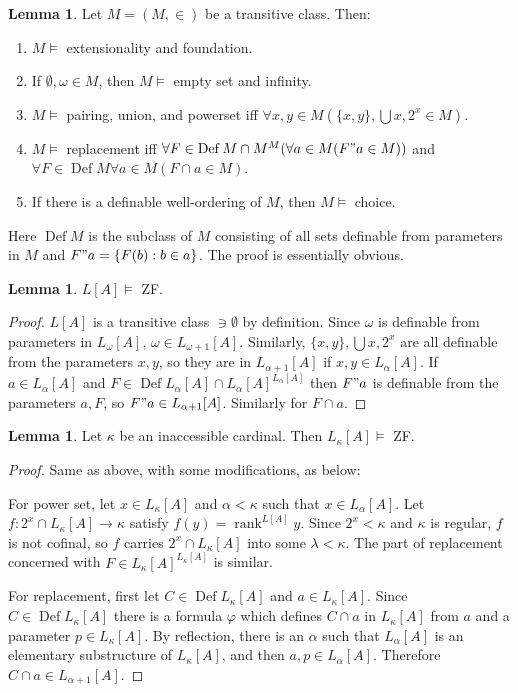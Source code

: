 \documentclass[12pt]{report}
\newcommand{\rank}{\operatorname{rank}}
\DeclareMathOperator{\Def}{Def}
\theoremstyle{definition}
\newtheorem{lemma}[theorem]{Lemma}
\begin{document}
\begin{lemma}
Let $M = (M, \in)$ be a transitive class. Then:
\begin{enumerate}
\item $M \models $ extensionality and foundation.
\item If $\emptyset, \omega \in M$, then $M \models $ empty set and infinity.
\item $M \models $ pairing, union, and powerset iff $\forall x, y \in M(\{x, y\}, \bigcup x, 2^x \in M)$.
\item $M \models $ replacement iff $\forall F \in \Def M \cap M^M(\forall a \in M(F"a \in M))$ and $\forall F \in \Def M \forall a \in M(F \cap a \in M)$.
\item If there is a definable well-ordering of $M$, then $M \models $ choice.
\end{enumerate}
\end{lemma}
Here $\Def M$ is the subclass of $M$ consisting of all sets definable from parameters in $M$ and $F"a = \{F(b): b \in a\}$. The proof is essentially obvious.

\begin{lemma}
$L[A] \models $ ZF.
\end{lemma}
\begin{proof}
$L[A]$ is a transitive class $\ni \emptyset$ by definition. Since $\omega$ is definable from parameters in $L_\omega[A]$, $\omega \in L_{\omega + 1}[A]$.
Similarly, $\{x, y\},\bigcup x, 2^x$ are all definable from the parameters $x,y$, so they are in $L_{\alpha + 1}[A]$ if $x, y\in L_\alpha[A]$.
If $a \in L_\alpha[A]$ and $F \in \Def L_\alpha[A] \cap L_{\alpha}[A]^{L_\alpha[A]}$ then $F"a$ is definable from the parameters $a,F$, so $F"a \in L_{\alpha + 1}[A]$. Similarly for $F \cap a$.
\end{proof}

\begin{lemma}
Let $\kappa$ be an inaccessible cardinal. Then $L_\kappa[A] \models$ ZF.
\end{lemma}
\begin{proof}
Same as above, with some modifications, as below:

For power set, let $x \in L_\kappa[A]$ and $\alpha < \kappa$ such that $x \in L_\alpha[A]$. Let $f: 2^x \cap L_\kappa[A] \to \kappa$ satisfy $f(y) = \rank^{L[A]} y$.
Since $2^x < \kappa$ and $\kappa$ is regular, $f$ is not cofinal, so $f$ carries $2^x \cap L_\kappa[A]$ into some $\lambda < \kappa$.
The part of replacement concerned with $F \in L_\kappa[A]^{L_\kappa[A]}$ is similar.

For replacement, first let $C \in \Def L_\kappa[A]$ and $a \in L_\kappa[A]$. Since $C \in \Def L_\kappa[A]$ there is a formula $\varphi$ which defines $C \cap a$ in $L_\kappa[A]$ from $a$ and a parameter $p \in L_\kappa[A]$.
By reflection, there is an $\alpha$ such that $L_\alpha[A]$ is an elementary substructure of $L_\kappa[A]$, and then $a,p \in L_\alpha[A]$.
Therefore $C \cap a \in L_{\alpha + 1}[A]$.
\end{proof}
\end{document}
